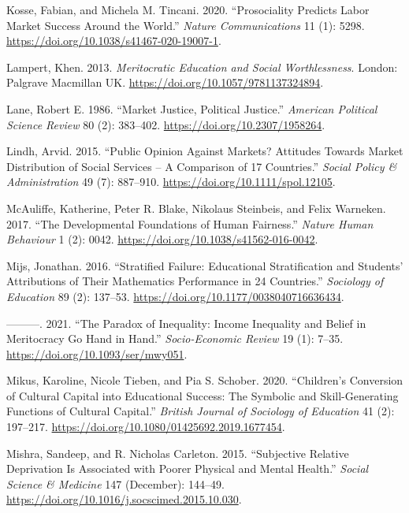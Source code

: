 \documentclass[
  letterpaper,
  DIV=11,
  numbers=noendperiod]{scrartcl}
\newlength{\cslhangindent}
\newenvironment{CSLReferences}[2] %
 {\begin{list}{}{%
  \setlength{\itemindent}{0pt}
  \setlength{\leftmargin}{0pt}
  \setlength{\parsep}{0pt}
  \ifodd #1
   \setlength{\leftmargin}{\cslhangindent}
   \setlength{\itemindent}{-1\cslhangindent}
  \fi
  \setlength{\itemsep}{#2\baselineskip}}}
 {\end{list}}
\begin{document}
\begin{CSLReferences}{1}{0}
Kosse, Fabian, and Michela M. Tincani. 2020. {``Prosociality Predicts
Labor Market Success Around the World.''} \emph{Nature Communications}
11 (1): 5298. \url{https://doi.org/10.1038/s41467-020-19007-1}.

Lampert, Khen. 2013. \emph{Meritocratic {Education} and {Social
Worthlessness}}. London: Palgrave Macmillan UK.
\url{https://doi.org/10.1057/9781137324894}.

Lane, Robert E. 1986. {``Market {Justice}, {Political Justice}.''}
\emph{American Political Science Review} 80 (2): 383--402.
\url{https://doi.org/10.2307/1958264}.

Lindh, Arvid. 2015. {``Public {Opinion} Against {Markets}? {Attitudes}
Towards {Market Distribution} of {Social Services} -- {A Comparison} of
17 {Countries}.''} \emph{Social Policy \& Administration} 49 (7):
887--910. \url{https://doi.org/10.1111/spol.12105}.

McAuliffe, Katherine, Peter R. Blake, Nikolaus Steinbeis, and Felix
Warneken. 2017. {``The Developmental Foundations of Human Fairness.''}
\emph{Nature Human Behaviour} 1 (2): 0042.
\url{https://doi.org/10.1038/s41562-016-0042}.

Mijs, Jonathan. 2016. {``Stratified {Failure}: {Educational
Stratification} and {Students}' {Attributions} of {Their Mathematics
Performance} in 24 {Countries}.''} \emph{Sociology of Education} 89 (2):
137--53. \url{https://doi.org/10.1177/0038040716636434}.

---------. 2021. {``The Paradox of Inequality: Income Inequality and
Belief in Meritocracy Go Hand in Hand.''} \emph{Socio-Economic Review}
19 (1): 7--35. \url{https://doi.org/10.1093/ser/mwy051}.

Mikus, Karoline, Nicole Tieben, and Pia S. Schober. 2020. {``Children's
Conversion of Cultural Capital into Educational Success: The Symbolic
and Skill-Generating Functions of Cultural Capital.''} \emph{British
Journal of Sociology of Education} 41 (2): 197--217.
\url{https://doi.org/10.1080/01425692.2019.1677454}.

Mishra, Sandeep, and R. Nicholas Carleton. 2015. {``Subjective Relative
Deprivation Is Associated with Poorer Physical and Mental Health.''}
\emph{Social Science \& Medicine} 147 (December): 144--49.
\url{https://doi.org/10.1016/j.socscimed.2015.10.030}.


\end{CSLReferences}
\end{document}

